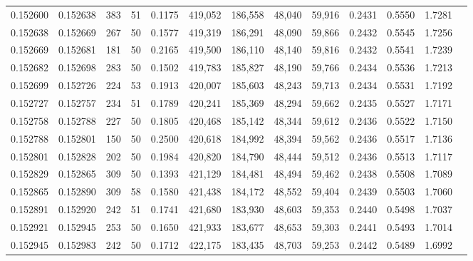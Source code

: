 \begin{tabular}{rrrrrrrrrrrrr}
0.152600 & 0.152638 &   383 &  51 &                                     0.1175 & 419,052 & 186,558 &  48,040 &  59,916 & 0.2431 & 0.5550 & 1.7281 \\
0.152638 & 0.152669 &   267 &  50 &                                     0.1577 & 419,319 & 186,291 &  48,090 &  59,866 & 0.2432 & 0.5545 & 1.7256 \\
0.152669 & 0.152681 &   181 &  50 &                                     0.2165 & 419,500 & 186,110 &  48,140 &  59,816 & 0.2432 & 0.5541 & 1.7239 \\
0.152682 & 0.152698 &   283 &  50 &                                     0.1502 & 419,783 & 185,827 &  48,190 &  59,766 & 0.2434 & 0.5536 & 1.7213 \\
0.152699 & 0.152726 &   224 &  53 &                                     0.1913 & 420,007 & 185,603 &  48,243 &  59,713 & 0.2434 & 0.5531 & 1.7192 \\
0.152727 & 0.152757 &   234 &  51 &                                     0.1789 & 420,241 & 185,369 &  48,294 &  59,662 & 0.2435 & 0.5527 & 1.7171 \\
0.152758 & 0.152788 &   227 &  50 &                                     0.1805 & 420,468 & 185,142 &  48,344 &  59,612 & 0.2436 & 0.5522 & 1.7150 \\
0.152788 & 0.152801 &   150 &  50 &                                     0.2500 & 420,618 & 184,992 &  48,394 &  59,562 & 0.2436 & 0.5517 & 1.7136 \\
0.152801 & 0.152828 &   202 &  50 &                                     0.1984 & 420,820 & 184,790 &  48,444 &  59,512 & 0.2436 & 0.5513 & 1.7117 \\
0.152829 & 0.152865 &   309 &  50 &                                     0.1393 & 421,129 & 184,481 &  48,494 &  59,462 & 0.2438 & 0.5508 & 1.7089 \\
0.152865 & 0.152890 &   309 &  58 &                                     0.1580 & 421,438 & 184,172 &  48,552 &  59,404 & 0.2439 & 0.5503 & 1.7060 \\
0.152891 & 0.152920 &   242 &  51 &                                     0.1741 & 421,680 & 183,930 &  48,603 &  59,353 & 0.2440 & 0.5498 & 1.7037 \\
0.152921 & 0.152945 &   253 &  50 &                                     0.1650 & 421,933 & 183,677 &  48,653 &  59,303 & 0.2441 & 0.5493 & 1.7014 \\
0.152945 & 0.152983 &   242 &  50 &                                     0.1712 & 422,175 & 183,435 &  48,703 &  59,253 & 0.2442 & 0.5489 & 1.6992 \\

\end{tabular}
